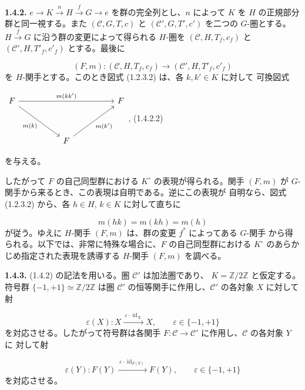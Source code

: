 \clearpage
{}%
\noindent\textbf{1.4.2.}\quad
$e\to K\xrightarrow{n}H\xrightarrow{f}G\to e$
を群の完全列とし、$n$ によって $K$ を $H$ の正規部分群と同一視する。また
$(\mathcal C,G,T,c)$ と $(\mathcal C',G,T',c')$ を二つの $G$-圏とする。
$H\xrightarrow{f}G$ に沿う群の変更によって得られる $H$-圏を
$(\mathcal C,H,T_f,c_f)$ と $(\mathcal C',H,T'_f,c'_f)$ とする。最後に

\begin{equation}
  (F,m)\colon(\mathcal C,H,T_f,c_f)
  \longrightarrow(\mathcal C',H,T'_f,c'_f)
  \tag{1.4.2.1}
\end{equation}
を $H$-関手とする。このとき図式 (1.2.3.2) は、各 $k,k'\in K$ に対して
可換図式

\begin{center}
  $\begin{tikzcd}[ampersand replacement=\&,column sep=5em,row sep=3.5em]
    F \arrow[rr,"{m(kk')}"] \arrow[dr,"{m(k)}"']
      \& \& F \\
      \& F \arrow[ur,"{m(k')}"'] \&
  \end{tikzcd}$,
  \hfill\textup{(1.4.2.2)}
\end{center}
を与える。

したがって $F$ の自己同型群における $K^\circ$ の表現が得られる。関手
$(F,m)$ が $G$-関手から来るとき、この表現は自明である。逆にこの表現が
自明なら、図式 (1.2.3.2) から、各 $h\in H$, $k\in K$ に対して直ちに

\begin{equation}
  m(hk)=m(kh)=m(h)
  \tag{1.4.2.3}
\end{equation}
が従う。ゆえに $H$-関手 $(F,m)$ は、群の変更 $f^*$ によってある $G$-関手
から得られる。以下では、非常に特殊な場合に、$F$ の自己同型群における
$K^\circ$ のあらかじめ指定された表現を誘導する $H$-関手 $(F,m)$ を調べる。

\noindent\textbf{1.4.3.}\quad
(1.4.2) の記法を用いる。圏 $\mathcal C'$ は加法圏であり、
$K=\mathbb Z/2\mathbb Z$ と仮定する。符号群
$\{-1,+1\}\simeq\mathbb Z/2\mathbb Z$
は圏 $\mathcal C'$ の恒等関手に作用し、$\mathcal C'$ の各対象 $X$ に対して
射

\begin{equation}
  \varepsilon(X)\colon
  X\xrightarrow{\,\varepsilon\cdot\operatorname{id}_X\,}X,
  \qquad \varepsilon\in\{-1,+1\}
  \tag{1.4.3.1}
\end{equation}
を対応させる。したがって符号群は各関手
$F\colon\mathcal C\to\mathcal C'$ に作用し、$\mathcal C$ の各対象 $Y$ に
対して射

\begin{equation}
  \varepsilon(Y)\colon
  F(Y)\xrightarrow{\,\varepsilon\cdot\operatorname{id}_{F(Y)}\,}F(Y),
  \qquad \varepsilon\in\{-1,+1\}
  \tag{1.4.3.2}
\end{equation}
を対応させる。
